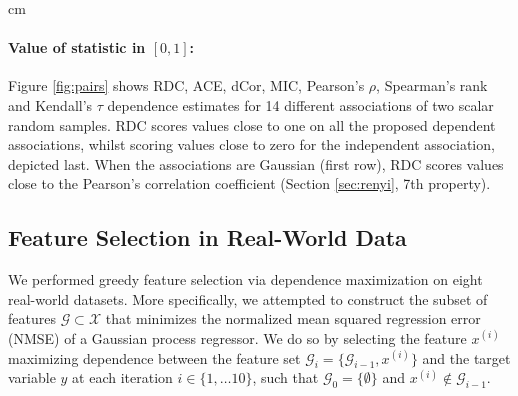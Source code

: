 \documentclass{article}
\begin{document}
\begin{table}[h!]
  \caption{Average running times (in seconds) for dependence measures on
  versus sample sizes.}
   cm
\label{fig:times}
\end{table}

\paragraph{Value of statistic in $[0,1]$:} Figure \ref{fig:pairs} shows RDC,
ACE, dCor, MIC, Pearson's $\rho$, Spearman's rank and Kendall's $\tau$
dependence estimates for 14 different associations of two scalar random
samples.  RDC scores values close to one on all the proposed dependent
associations, whilst scoring values close to zero for the independent
association, depicted last.  When the associations are Gaussian (first row),
RDC scores values close to the Pearson's correlation coefficient
(Section \ref{sec:renyi}, 7th property).

\subsection{Feature Selection in Real-World Data} We performed greedy feature
selection via dependence maximization \cite{Song12} on eight real-world
datasets. More specifically, we attempted to construct the subset of features
$\mathcal{G} \subset \mathcal{X}$ that minimizes the normalized mean squared
regression error (NMSE) of a Gaussian process regressor. We do so by selecting
the feature $x^{(i)}$ maximizing dependence between the feature set
$\mathcal{G}_{i} = \{\mathcal{G}_{i-1} , x^{(i)}\}$ and the target variable $y$
at each iteration $i \in \{1, \ldots 10\}$, such that $\mathcal{G}_0 = \{
  \emptyset \}$ and $x^{(i)} \notin \mathcal{G}_{i-1}$.
\end{document}
